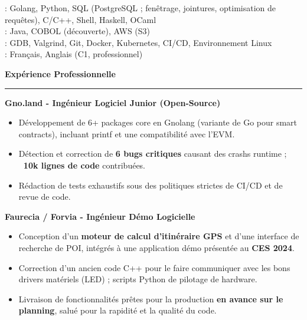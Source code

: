 \documentclass[9pt]{extarticle}
\begin{document}
\hspace*{5pt}{\bfseries Maîtrise}: Golang, Python, SQL (PostgreSQL ; fenêtrage, jointures, optimisation de requêtes), C/C++, Shell, Haskell, OCaml
\\
\hspace*{5pt}{\bfseries Notions}: Java, COBOL (découverte), AWS (S3)
\\
\hspace*{5pt}{\bfseries Outils}: GDB, Valgrind, Git, Docker, Kubernetes, CI/CD, Environnement Linux
\\
\hspace*{5pt}{\bfseries Langues}: Français, Anglais (C1, professionnel)

\par\vspace{5pt}

{\large\bfseries Expérience Professionnelle}
\par\vspace{-8pt}
\rule{\linewidth}{0.4pt}
\par\vspace{5pt}

{\bfseries Gno.land - Ingénieur Logiciel Junior (Open-Source)}
\begin{itemize}[noitemsep, topsep=0pt]
	\item Développement de 6+ packages core en Gnolang (variante de Go pour smart contracts), incluant printf et une compatibilité avec l'EVM.
	\item Détection et correction de {\bfseries 6 bugs critiques} causant des crashs runtime ; {\bfseries ~10k lignes de code} contribuées.
	\item Rédaction de tests exhaustifs sous des politiques strictes de CI/CD et de revue de code.
\end{itemize}

\par\vspace{5pt}

{\bfseries Faurecia / Forvia - Ingénieur Démo Logicielle}
\begin{itemize}[noitemsep, topsep=0pt]
	\item Conception d'un {\bfseries moteur de calcul d'itinéraire GPS} et d'une interface de recherche de POI, intégrés à une application démo présentée au {\bfseries CES 2024}.
	\item Correction d'un ancien code C++ pour le faire communiquer avec les bons drivers matériels (LED) ; scripts Python de pilotage de hardware.
	\item Livraison de fonctionnalités prêtes pour la production {\bfseries en avance sur le planning}, salué pour la rapidité et la qualité du code.
\end{itemize}
\end{document}
